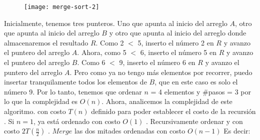 \documentclass[10pt,a4paper]{article}
\begin{document}
\newline
\newline
\begin{figure}[h]
	\centering
\texttt{[image: merge-sort-2]}
	\label{drivers1}
\end{figure}
\newline
\newline
Inicialmente, tenemos tres punteros. Uno que apunta al inicio del arreglo $A$, otro que apunta al inicio del arreglo $B$ y otro que apunta al inicio del arreglo donde almacenaremos el resultado $R$.
\newline
\newline
Como 2 $<$ 5, inserto el número 2 en $R$ y avanzo el puntero del arreglo $A$. 
\newline
\newline
Ahora, como 5 $<$ 6, inserto el número 5 en $R$ y avanzo el puntero del arreglo $B$.
\newline
\newline
Como 6 $<$ 9, inserto el número 6 en $R$ y avanzo el puntero del arreglo $A$. Pero como ya no tengo más elementos por recorrer, puedo insertar tranquilamente todos los elementos de $B$, que en este caso es solo el número 9.
\newline
\newline
Por lo tanto, tenemos que ordenar $n$ = 4 elementos y \#pasos = 3 por lo que la complejidad es $O(n)$.  
\newline
\newline
Ahora, analicemos la complejidad de este algoritmo.
\newline
\newline
{} con costo $T(n)$ definido para poder establecer el costo de la recursión
\newline
{}. Si $n=1$, ya está ordenado con costo $O(1)$
\newline
{}. Recursivamente ordenar  y  con costo $2T(\displaystyle \frac{n}{2})$
\newline
{}. $Merge$ las dos mitades ordenadas con costo $O(n-1)$ 
\newline
\newline
Es decir:
\newline
\newline
\end{document}
